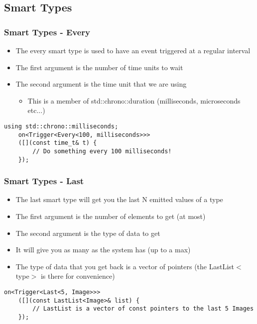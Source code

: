 \documentclass{beamer}
\begin{document}
\subsection{Smart Types}
\begin{frame}[fragile]
	\frametitle{Smart Types - Every}
	\begin{itemize}
		\item The every smart type is used to have an event triggered at a regular interval
		\item The first argument is the number of time units to wait
		\item The second argument is the time unit that we are using
		\begin{itemize}
			\item This is a member of std::chrono::duration (milliseconds, microseconds etc...)
		\end{itemize}
	\end{itemize}

	\begin{lstlisting}[language=nuclear]
	using std::chrono::milliseconds;
	on<Trigger<Every<100, milliseconds>>>
	([](const time_t& t) {
	    // Do something every 100 milliseconds!
	});
	\end{lstlisting}
\end{frame}

\begin{frame}[fragile]
	\frametitle{Smart Types - Last}
	\begin{itemize}
		\item The last smart type will get you the last N emitted values of a type
		\item The first argument is the number of elements to get (at most)
		\item The second argument is the type of data to get
		\item It will give you as many as the system has (up to a max)
		\item The type of data that you get back is a vector of pointers (the LastList$<$type$>$ is there for convenience)
	\end{itemize}
	
	\begin{lstlisting}[language=nuclear]
	on<Trigger<Last<5, Image>>>
	([](const LastList<Image>& list) {
	    // LastList is a vector of const pointers to the last 5 Images
	});
	\end{lstlisting}
\end{frame}
\end{document}
